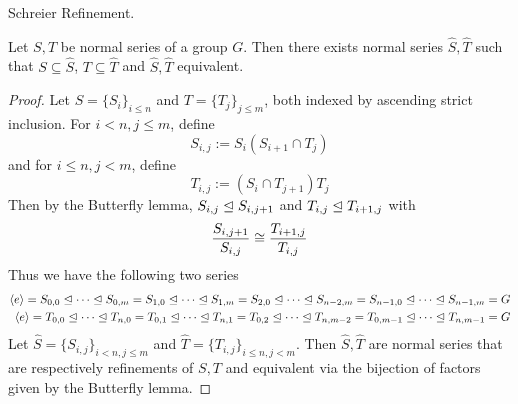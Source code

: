 \documentclass[../../book.tex]{subfiles}
\begin{document}
\begin{thm} Schreier Refinement. 
    
    Let $S, T$ be normal series of a group $G$. 
    Then there exists normal series $\hat{S}, \hat{T}$ such that
    $S \subseteq \hat{S}$, $T \subseteq \hat{T}$ and $\hat{S}, \hat{T}$ equivalent. 
    
\end{thm}
\begin{proof}
    
    Let $S = \{S_i\}_{i \leq n}$ and $T = \{T_j\}_{j \leq m}$,
    both indexed by ascending strict inclusion. 
    For $i < n, j \leq m$, define \[
        S_{i,j} := S_i (S_{i+1} \cap T_j)
    \]
    and for $i \leq n, j < m$, define \[
        T_{i,j} := (S_{i} \cap T_{j+1}) T_j
    \]
    Then by the Butterfly lemma, 
    $S_{i,j} \trianglelefteq S_{i,j+1}$ and $T_{i,j} \trianglelefteq T_{i+1,j}$
    with \[
        \frac{S_{i,j+1}}{S_{i,j}} \cong \frac{T_{i+1,j}}{T_{i,j}}
    \]
    Thus we have the following two series \begin{align*}
        \langle e\rangle = S_{0,0} \trianglelefteq \cdots \trianglelefteq S_{0,m} 
        = S_{1,0} \trianglelefteq \cdots \trianglelefteq S_{1,m}
        = S_{2,0} \trianglelefteq \cdots \trianglelefteq S_{n-2,m}
        = S_{n-1,0} \trianglelefteq \cdots \trianglelefteq S_{n-1,m} = G
        \\
        \langle e\rangle = T_{0,0} \trianglelefteq \cdots \trianglelefteq T_{n,0} 
        = T_{0,1} \trianglelefteq \cdots \trianglelefteq T_{n,1} 
        = T_{0,2}\trianglelefteq \cdots \trianglelefteq T_{n,m-2}
        = T_{0,m-1} \trianglelefteq \cdots \trianglelefteq T_{n,m-1} = G
    \end{align*}
    Let $\hat{S} = \{ S_{i,j} \}_{i<n, j\leq m}$ and 
    $\hat{T} = \{T_{i, j}\}_{i\leq n, j < m}$.
    Then $\hat{S}, \hat{T}$ are normal series 
    that are respectively refinements of $S, T$
    and equivalent via the bijection of factors given by the Butterfly lemma. 
    
\end{proof}
\end{document}
